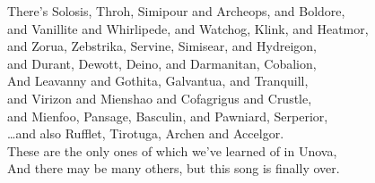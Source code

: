 \documentclass{amsart}
\begin{document}
There's Solosis, Throh, Simipour and Archeops, and Boldore,\\
and Vanillite and Whirlipede, and Watchog, Klink, and Heatmor,\\
and Zorua, Zebstrika, Servine, Simisear, and Hydreigon,\\
and Durant, Dewott, Deino, and Darmanitan, Cobalion,\\

And Leavanny and Gothita, Galvantua, and Tranquill,\\
and Virizon and Mienshao and Cofagrigus and Crustle,\\
and Mienfoo, Pansage, Basculin, and Pawniard, Serperior,\\
\dots and also Rufflet, Tirotuga, Archen and Accelgor.\\

These are the only ones of which we've learned of in Unova,\\
And there may be many others, but this song is finally over.
\end{document}
